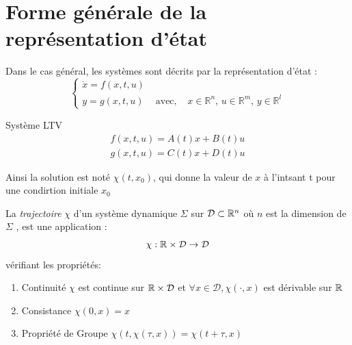 \documentclass[main.tex]{subfiles}
\begin{document}
\section{Forme générale de la représentation d'état}
Dans le cas général, les systèmes sont décrits par la représentation d'état :
\[\left\{ \begin{matrix}
      \dot{x} = f(x,t,u)\\
y = g(x,t,u)& \text{	avec, } & x\in \mathbb{R}^n\text{, }u\in \mathbb{R}^m\text{, }y\in \mathbb{R}^l
\end{matrix} \right.\]

\begin{exemple} Système LTV
\begin{align*}
  f(x,t,u) = A(t)x + B(t) u\\
  g(x,t,u) = C(t)x +D(t)u
\end{align*}
\end{exemple}

Ainsi la solution est noté $\chi (t,x_0)$, qui donne la valeur de $x$ à l'intsant t pour une condirtion initiale $x_0$


\begin{defin}
  La \emph{trajectoire} $\chi$ d'un système dynamique $\Sigma$ sur $\mathcal{D}\subset \mathbb{R}^n$ où $n$ est la dimension de $\Sigma$ , est une application :
  \[
    \chi: \mathbb{R} \times \mathcal{D} \to \mathcal{D}
  \]
  vérifiant les propriétés:
  \begin{enumerate}
  \item Continuité $\chi $ est continue sur $\mathbb{R} \times \mathcal{D}$ et $\forall x \in \mathcal{D}, \chi (\cdot,x) $ est dérivable sur $\mathbb{R}$
  \item Consistance $\chi(0,x) = x$
  \item Propriété de Groupe $ \chi(t,\chi(\tau,x))=\chi(t+\tau,x)$
  \end{enumerate}
\end{defin}
\end{document}

